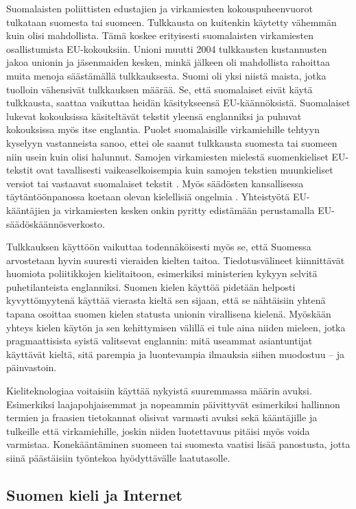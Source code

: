 \begin{multicols}{2}
Suomalaisten poliittisten edustajien ja virkamiesten kokouspuheenvuorot tulkataan suomesta tai suomeen. Tulkkausta on kuitenkin käytetty vähemmän kuin olisi mahdollista. Tämä koskee erityisesti suomalaisten virkamiesten osallistumista EU-kokouksiin. Unioni muutti 2004 tulkkausten kustannusten jakoa unionin ja jäsenmaiden kesken, minkä jälkeen oli mahdollista rahoittaa muita menoja säästämällä tulkkauksesta. Suomi oli yksi niistä maista, jotka tuolloin vähensivät tulkkauksen määrää.  Se, että suomalaiset eivät käytä tulkkausta, saattaa vaikuttaa heidän käsitykseensä EU-käännöksistä. Suomalaiset lukevat kokouksissa käsiteltävät tekstit yleensä englanniksi ja puhuvat kokouksissa myös itse englantia. Puolet suomalaisille virkamiehille tehtyyn kyselyyn vastanneista sanoo, ettei ole saanut tulkkausta suomesta tai suomeen niin usein kuin olisi halunnut. Samojen virkamiesten mielestä suomenkieliset EU-tekstit ovat tavallisesti vaikeaselkoisempia kuin samojen tekstien muunkieliset versiot tai vastaavat suomalaiset tekstit \cite{Piehl2008}. Myös säädösten kansallisessa täytäntöönpanossa koetaan olevan kielellisiä ongelmia \cite{OECD2010}. Yhteistyötä EU-kääntäjien ja virkamiesten kesken onkin pyritty edistämään perustamalla EU-säädöskäännösverkosto.

Tulkkauksen käyttöön vaikuttaa todennäköisesti myös se, että Suomessa arvostetaan hyvin suuresti vieraiden kielten taitoa. Tiedotusvälineet kiinnittävät huomiota poliitikkojen kielitaitoon, esimerkiksi ministerien kykyyn selvitä puhetilanteista englanniksi. Suomen kielen käyttöä pidetään helposti kyvyttömyytenä käyttää vierasta kieltä sen sijaan, että se nähtäisiin yhtenä tapana osoittaa suomen kielen statusta unionin virallisena kielenä.  Myöskään yhteys kielen käytön ja sen kehittymisen välillä ei tule aina niiden mieleen, jotka pragmaattisista syistä valitsevat englannin: mitä useammat asiantuntijat käyttävät kieltä, sitä parempia ja luontevampia ilmauksia siihen muodostuu -- ja päinvastoin.

Kieliteknologiaa voitaisiin käyttää nykyistä suuremmassa määrin avuksi. Esimerkiksi laajapohjaisemmat ja nopeammin päivittyvät esimerkiksi hallinnon termien ja fraasien tietokannat olisivat varmasti avuksi sekä kääntäjille ja tulkeille että virkamiehille, joskin niiden luotettavuus pitäisi myös voida varmistaa.  Konekääntäminen suomeen tai suomesta vaatisi lisää panostusta, jotta siinä päästäisiin työntekoa hyödyttävälle laatutasolle.

\subsection{Suomen kieli ja Internet}


\end{multicols}
